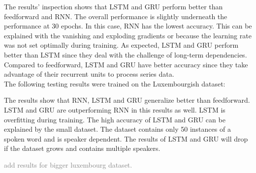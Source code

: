 The results' inspection shows that LSTM and GRU perform better than feedforward
and RNN. The overall performance is slightly underneath the performance at 30
epochs. In this case, RNN has the lowest accuracy. This can be explained with
the vanishing and exploding gradients or because the learning rate was not set
optimally during training. As expected, LSTM and GRU perform better than LSTM
since they deal with the challenge of long-term dependencies. Compared to
feedforward, LSTM and GRU have better accuracy since they take advantage of
their recurrent units to process series data.\\

The following testing results were trained on the Luxembourgish dataset:

\begin{table}[H]
    \centering
\end{table}

The results show that RNN, LSTM and GRU generalize better than feedforward.
LSTM and GRU are outperforming RNN in this results as well. LSTM is overfitting
during training. The high accuracy of LSTM and GRU can be explained by the small
dataset. The dataset contains only 50 instances of a spoken word and is speaker
dependent. The results of LSTM and GRU will drop if the dataset grows and
contains multiple speakers.

\textcolor{gray}{add results for bigger luxembourg dataset.}
